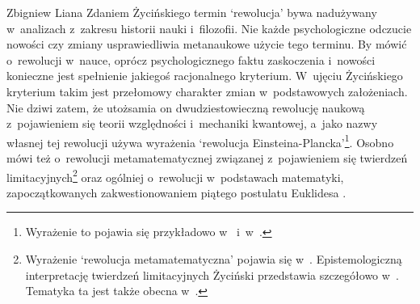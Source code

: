 \begin{artplenv}{Zbigniew Liana}
Zdaniem Życińskiego
\parencites*[s.~7]{zycinski_structure_1988}[s.~13]{zycinski_struktura_2013}
termin `rewolucja' bywa nadużywany w~analizach z~zakresu
historii nauki i~filozofii. Nie każde psychologiczne odczucie nowości czy zmiany usprawiedliwia metanaukowe
użycie tego terminu. By mówić o~rewolucji w~nauce, oprócz psychologicznego faktu zaskoczenia i~nowości konieczne jest
spełnienie jakiegoś racjonalnego kryterium. W~ujęciu Życińskiego kryterium takim jest przełomowy charakter zmian w~podstawowych
założeniach. Nie dziwi zatem, że utożsamia on dwudziestowieczną rewolucję naukową z~pojawieniem się teorii
względności i~mechaniki kwantowej, a~jako nazwy własnej tej rewolucji używa wyrażenia `rewolucja
Einsteina-Plancka'\footnote{Wyrażenie to pojawia się przykładowo
w~\parencites[s.~13.25]{zycinski_structure_1988}[s.~24.45]{zycinski_struktura_2013}
i~w~\parencite[s.~228.258]{zycinski_elementy_2015}.
}. Osobno mówi też o~rewolucji metamatematycznej związanej z~pojawieniem się twierdzeń
limitacyjnych\footnote{Wyrażenie `rewolucja metamatematyczna' pojawia się
w~\parencites[s.~101]{zycinski_structure_1988}[s.~181]{zycinski_struktura_2013}.
Epistemologiczną interpretację twierdzeń
limitacyjnych Życiński przedstawia szczegółowo
w~\parencites*[s.~118–126]{zycinski_teizm_1985}[s.~18–46]{zycinski_teizm_1988}.
Tematyka ta jest także obecna
w~\parencites[rozdział IV]{zycinski_structure_1988,zycinski_struktura_2013}[s.~61–68]{zycinski_granice_1993}[s.~262–276]{zycinski_elementy_1996}.
} oraz ogólniej o~rewolucji w~podstawach matematyki,
zapoczątkowanych zakwestionowaniem piątego postulatu Euklidesa
\parencite[zob.][s.~196]{zycinski_jezyk_1983}.


\end{artplenv}
